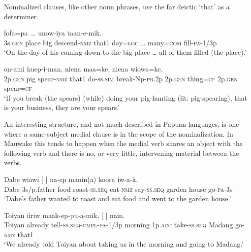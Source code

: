 Nominalized clauses, like other noun phrases, use the far deictic  `that' as a determiner. 

\ea%
\label{ex:x1842}
    fofa=pa  ...  unow-iya taan-e-mik. \\
     3s.\textsc{gen}  place  big  descend-\textsc{nmz}  that1  day=\textsc{loc}  {\dots}  many=\textsc{com} fill-\textsc{pa}-1/3p \\
\glt `On the day of his coming down to the big place {\dots} all of them filled (the place).'
\z

\ea%
\label{ex:x1843}
    on-ami  kuep-i-man, niena  maa=ke,  niena  wiowa=ke. \\
     2p.\textsc{gen}  pig  spear-\textsc{nmz}  that1  do-\textsc{ss}.\textsc{sim}  break-Np-\textsc{pr}.2p 2p.\textsc{gen}  thing=\textsc{cf}  2p.\textsc{gen}  spear=\textsc{cf} \\
\glt `If you break (the spears) (while) doing your pig-hunting (lit: pig-spearing), that is your business, they are your spears.'
\z

An interesting structure, and not much described in Papuan languages, is one where a same-subject medial clause is in the scope of the nominalization. In Mauwake this tends to happen when the medial verb shares an object with the following verb and there is no, or very little, intervening material between the verbs. 

\ea%
\label{ex:x1885}
\gll Dabe  wiawi  [  ]  na-ep manin(a)  koora  iw-a-k. \\
     Dabe  3s/p.father  food  roast-\textsc{ss}.\textsc{seq}  eat-\textsc{nmz}  say-\textsc{ss}.\textsc{seq} garden  house  go-\textsc{pa}-3s \\
\glt `Dabe's father wanted to roast and eat food and went to the garden house.'
\z

\ea%
\label{ex:x1845}
\gll Toiyan  iiriw  maak-ep-pu-a-mik,  [     ]  nain. \\
     Toiyan  already  tell-\textsc{ss}.\textsc{seq}-\textsc{cmpl}-\textsc{pa}-1/3p  morning  1p.\textsc{acc} take-\textsc{ss}.\textsc{seq}  Madang  go-\textsc{nmz}  that1 \\
\glt `We already told Toiyan about taking us in the morning and going to Madang.'
\z

